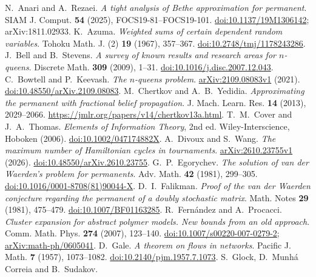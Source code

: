 N.~Anari and A.~Rezaei.
\emph{A tight analysis of Bethe approximation for permanent}.
SIAM J. Comput. \textbf{54} (2025), FOCS19-81--FOCS19-101.
\href{https://doi.org/10.1137/19M1306142}{doi:10.1137/19M1306142}; arXiv:1811.02933.
K.~Azuma.
\emph{Weighted sums of certain dependent random variables}.
Tohoku Math. J. (2) \textbf{19} (1967), 357--367.
\href{https://doi.org/10.2748/tmj/1178243286}{doi:10.2748/tmj/1178243286}.
J.~Bell and B.~Stevens.
\emph{A survey of known results and research areas for $n$-queens}.
Discrete Math. \textbf{309} (2009), 1--31.
\href{https://doi.org/10.1016/j.disc.2007.12.043}{doi:10.1016/j.disc.2007.12.043}.
C.~Bowtell and P.~Keevash.
\emph{The $n$-queens problem}.
\href{https://arxiv.org/abs/2109.08083v1}{arXiv:2109.08083v1} (2021).
\href{https://doi.org/10.48550/arXiv.2109.08083}{doi:10.48550/arXiv.2109.08083}.
M.~Chertkov and A.~B.~Yedidia.
\emph{Approximating the permanent with fractional belief propagation}.
J. Mach. Learn. Res. \textbf{14} (2013), 2029--2066.
\url{https://jmlr.org/papers/v14/chertkov13a.html}.
T.~M.~Cover and J.~A.~Thomas.
\emph{Elements of Information Theory}, 2nd ed.
Wiley-Interscience, Hoboken (2006).
\href{https://doi.org/10.1002/047174882X}{doi:10.1002/047174882X}.
A.~Divoux and S.~Wang.
\emph{The maximum number of Hamiltonian cycles in tournaments}.
\href{https://arxiv.org/abs/2610.23755v1}{arXiv:2610.23755v1} (2026).
\href{https://doi.org/10.48550/arXiv.2610.23755}{doi:10.48550/arXiv.2610.23755}.
G.~P.~Egorychev.
\emph{The solution of van der Waerden's problem for permanents}.
Adv. Math. \textbf{42} (1981), 299--305.
\href{https://doi.org/10.1016/0001-8708(81)90044-X}{doi:10.1016/0001-8708(81)90044-X}.
D.~I.~Falikman.
\emph{Proof of the van der Waerden conjecture regarding the permanent of a doubly stochastic matrix}.
Math. Notes \textbf{29} (1981), 475--479.
\href{https://doi.org/10.1007/BF01163285}{doi:10.1007/BF01163285}.
R.~Fernández and A.~Procacci.
\emph{Cluster expansion for abstract polymer models. New bounds from an old approach}.
Comm. Math. Phys. \textbf{274} (2007), 123--140.
\href{https://doi.org/10.1007/s00220-007-0279-2}{doi:10.1007/s00220-007-0279-2};
\href{https://doi.org/10.48550/arXiv.math-ph/0605041}{arXiv:math-ph/0605041}.
D.~Gale.
\emph{A theorem on flows in networks}.
Pacific J. Math. \textbf{7} (1957), 1073--1082.
\href{https://doi.org/10.2140/pjm.1957.7.1073}{doi:10.2140/pjm.1957.7.1073}.
S.~Glock, D.~Munhá Correia and B.~Sudakov.
